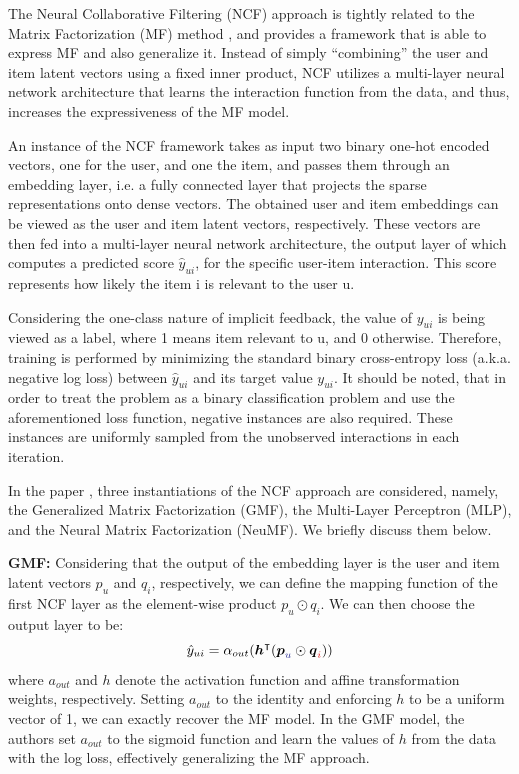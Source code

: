 
The Neural Collaborative Filtering (NCF) approach \cite{he2017neural} is tightly related to the Matrix Factorization (MF) method \cite{koren2009matrix}, and provides a framework that is able to express MF and also generalize it.
Instead of simply ``combining'' the user and item latent vectors using a fixed inner product, NCF utilizes a multi-layer neural network architecture that learns the interaction function from the data, and thus, increases the expressiveness of the MF model.

An instance of the NCF framework takes as input two binary one-hot encoded vectors, one for the user, and one the item, and passes them through an embedding layer, i.e. a fully connected layer that projects the sparse representations onto dense vectors.
The obtained user and item embeddings can be viewed as the user and item latent vectors, respectively.
These vectors are then fed into a multi-layer neural network architecture, the output layer of which computes a predicted score $\hat{y}_{ui}$, for the specific user-item interaction.
This score represents how likely the item i is relevant to the user u.

Considering the one-class nature of implicit feedback, the value of $y_{ui}$ is being viewed as a label, where 1 means item relevant to u, and 0 otherwise.
Therefore, training is performed by minimizing the standard binary cross-entropy loss (a.k.a. negative log loss) between $\hat{y}_{ui}$ and its target value $y_{ui}$.
It should be noted, that in order to treat the problem as a binary classification problem and use the aforementioned loss function, negative instances are also required.
These instances are uniformly sampled from the unobserved interactions in each iteration.

In the paper \cite{he2017neural}, three instantiations of the NCF approach are considered, namely, the Generalized Matrix Factorization (GMF), the Multi-Layer Perceptron (MLP), and the Neural Matrix Factorization (NeuMF).
We briefly discuss them below.

\textbf{GMF:} Considering that the output of the embedding layer is the user and item latent vectors $p_u$ and $q_i$, respectively, we can define the mapping function of the first NCF layer as the element-wise product $p_u \odot q_i$.
We can then choose the output layer to be:
\begin{equation}
    \hat{y}_{ui} = \alpha_{out}(\vec{h}^{\T}(\vec{p}_{\idxu} \odot \vec{q}_{\idxi}))\label{eq:gmf}
\end{equation}
where $a_{out}$ and $h$ denote the activation function and affine transformation weights, respectively.
Setting $a_{out}$ to the identity and enforcing $h$ to be a uniform vector of 1, we can exactly recover the MF model.
In the GMF model, the authors set $a_{out}$ to the sigmoid function and learn the values of $h$ from the data with the log loss, effectively generalizing the MF approach.

